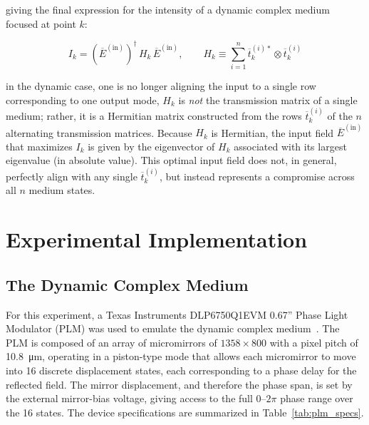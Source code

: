 \documentclass[11pt, twoside]{article}
\begin{document}
giving the final expression for the intensity of a dynamic complex medium focused at point $k$:

\begin{equation}
    I_k = (\overline{E}^{(\text{in})})^\dagger \, H_k \, \overline{E}^{(\text{in})}, \qquad
    H_k \equiv \sum_{i=1}^{n} \overline{t}^{(i)*}_k \otimes \overline{t}^{(i)}_k
    \label{eq:DCM_intensity}
\end{equation}

in the dynamic case, one is no longer aligning the input to a single row corresponding to one output mode, $H_k$ is \emph{not} the transmission matrix of a single medium; rather, it is a Hermitian matrix constructed from the rows $\overline{t}^{(i)}_k$ of the $n$ alternating transmission matrices. Because $H_k$ is Hermitian, the input field $\overline{E}^{(\text{in})}$ that maximizes $I_k$ is given by the eigenvector of $H_k$ associated with its largest eigenvalue (in absolute value). This optimal input field does not, in general, perfectly align with any single $\overline{t}^{(i)}_k$, but instead represents a compromise across all $n$ medium states.

\section{Experimental Implementation}
\label{sec:experiment}

\subsection{The Dynamic Complex Medium}
\label{subsec:PLM_calibration}

For this experiment, a Texas Instruments DLP6750Q1EVM 0.67'' Phase Light Modulator (PLM) was used to emulate the dynamic complex medium~\cite{tiplmguide, doamaralrocha2024fast}. The PLM is composed of an array of micromirrors of $1358 \times 800$ with a pixel pitch of \SI{10.8}{\micro\meter}, operating in a piston-type mode that allows each micromirror to move into 16 discrete displacement states, each corresponding to a phase delay for the reflected field. The mirror displacement, and therefore the phase span, is set by the external mirror-bias voltage, giving access to the full $0$--$2\pi$ phase range over the 16 states. The device specifications are summarized in Table~\ref{tab:plm_specs}.
\end{document}
